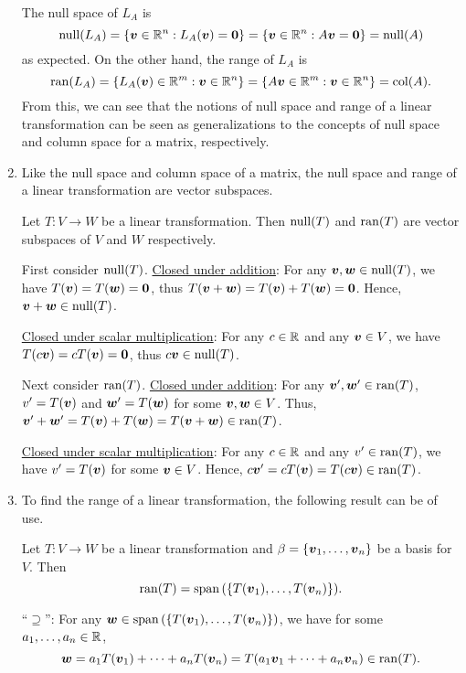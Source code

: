 \begin{enumerate}
The null space of \(L_A\) is
\[
\operatorname{null}(L_A)=\{\vb*{v}\in \mathbb{R}^n:L_A(\vb*{v})=\vb*{0}\}
=\{\vb*{v}\in\mathbb{R}^n: A\vb*{v}=\vb*{0}\}
=\operatorname{null}(A)
\]
as expected. On the other hand, the range of \(L_A\) is
\[
\operatorname{ran}(L_A)=\{L_A(\vb*{v})\in\mathbb{R}^m:\vb*{v}\in\mathbb{R}^n\}
=\{A\vb*{v}\in\mathbb{R}^m:\vb*{v}\in\mathbb{R}^n\}
=\operatorname{col}(A).
\]
From this, we can see that the notions of null space and range of a linear
transformation can be seen as generalizations to the concepts of null space and
column space for a matrix, respectively.

\item Like the null space and column space of a matrix, the null space and
range of a linear transformation are vector subspaces.

\begin{proposition}
\label{prp:null-ran-subspaces}
Let \(T:V\to W\) be a linear transformation. Then \(\operatorname{null}(T)\) and \(\operatorname{ran}(T)\)
are vector subspaces of \(V\) and \(W\) respectively.
\end{proposition}
\begin{pf}
First consider \(\operatorname{null}(T)\).
\underline{Closed under addition}: For any \(\vb*{v},\vb*{w}\in\operatorname{null}(T)\), we have
\(T(\vb*{v})=T(\vb*{w})=\vb*{0}\), thus
\(T(\vb*{v}+\vb*{w})=T(\vb*{v})+T(\vb*{w})=\vb*{0}\). Hence,
\(\vb*{v}+\vb*{w}\in\operatorname{null}(T)\).

\underline{Closed under scalar multiplication}: For any \(c\in\mathbb{R}\) and any
\(\vb*{v}\in V\), we have \(T(c\vb*{v})=cT(\vb*{v})=\vb*{0}\), thus
\(c\vb*{v}\in\operatorname{null}(T)\).

Next consider \(\operatorname{ran}(T)\).
\underline{Closed under addition}: For any \(\vb*{v}',\vb*{w}'\in\operatorname{ran}(T)\),
\(v'=T(\vb*{v})\) and \(\vb*{w}'=T(\vb*{w})\) for some
\(\vb*{v},\vb*{w}\in V\). Thus,
\(\vb*{v}'+\vb*{w}'=T(\vb*{v})+T(\vb*{w})=T(\vb*{v}+\vb*{w})\in\operatorname{ran}(T)\).

\underline{Closed under scalar multiplication}: For any \(c\in\mathbb{R}\) and any
\(v'\in\operatorname{ran}(T)\), we have \(v'=T(\vb*{v})\) for some \(\vb*{v}\in V\). Hence,
\(c\vb*{v}'=cT(\vb*{v})=T(c\vb*{v})\in\operatorname{ran}(T)\).
\end{pf}

\item To find the range of a linear transformation, the following result can be
of use.

\begin{proposition}
\label{prp:ran-spanning-set}
Let \(T:V\to W\) be a linear transformation and
\(\beta=\{\vb*{v}_1,\dotsc,\vb*{v}_n\}\) be a basis for \(V\). Then
\[
\operatorname{ran}(T)=\operatorname{span}\qty(\{T(\vb*{v}_1),\dotsc,T(\vb*{v}_n)\}).
\]
\end{proposition}
\begin{pf}
``\(\supseteq\)'': For any
\(\vb*{w}\in\operatorname{span}\qty(\{T(\vb*{v}_1),\dotsc,T(\vb*{v}_n)\})\), we have for some
\(a_1,\dotsc,a_n\in\mathbb{R}\),
\[
\vb*{w}=a_1T(\vb*{v}_1)+\dotsb+a_nT(\vb*{v}_n)
=T(a_1\vb*{v}_1+\dotsb+a_n\vb*{v}_n)\in\operatorname{ran}(T).
\]


\end{pf}
\end{enumerate}
